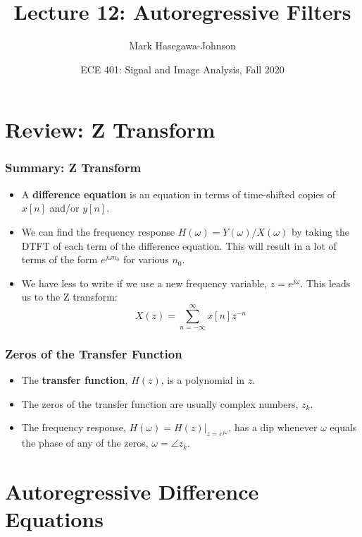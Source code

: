 \documentclass{beamer}
\title{Lecture 12: Autoregressive Filters}
\author{Mark Hasegawa-Johnson}
\date{ECE 401: Signal and Image Analysis, Fall 2020}
\begin{document}
\begin{frame}
  \maketitle
\end{frame}

\begin{frame}
  \tableofcontents
\end{frame}

\section[Review]{Review: Z Transform}
\setcounter{subsection}{1}

\begin{frame}
  \frametitle{Summary: Z Transform}
  \begin{itemize}
  \item A {\bf difference equation} is an equation in terms of
    time-shifted copies of $x[n]$ and/or $y[n]$.
  \item We can find the frequency response
    $H(\omega)=Y(\omega)/X(\omega)$ by taking the DTFT of each term of
    the difference equation.  This will result in a lot of terms of
    the form $e^{j\omega n_0}$ for various $n_0$.
  \item We have less to write if we use a new frequency variable,
    $z=e^{j\omega}$.  This leads us to the Z transform:
    \[
    X(z) = \sum_{n=-\infty}^\infty x[n]z^{-n}
    \]
  \end{itemize}
\end{frame}

\begin{frame}
  \frametitle{Zeros of the Transfer Function}
  \begin{itemize}
  \item The {\bf transfer function}, $H(z)$, is a polynomial in $z$.
  \item The zeros of the transfer function are usually complex numbers, $z_k$.
  \item The frequency response, $H(\omega) = H(z)\vert_{z=e^{j\omega}}$, has a dip
    whenever $\omega$ equals the phase of any of the zeros, $\omega=\angle z_k$.
  \end{itemize}
\end{frame}
    
\section[Autoregressive]{Autoregressive Difference Equations}
\setcounter{subsection}{1}
\end{document}
